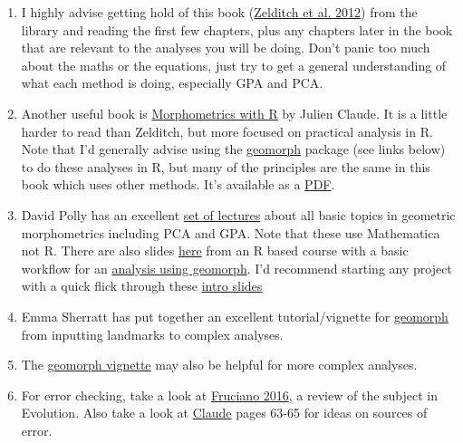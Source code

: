 \documentclass[]{book}
\begin{document}
\begin{enumerate}
\def\labelenumi{\arabic{enumi}.}
\item
  I highly advise getting hold of this book
  (\href{http://store.elsevier.com/Geometric-Morphometrics-for-Biologists/Miriam-Zelditch/isbn-9780123869036/}{Zelditch
  et al. 2012}) from the library and reading the first few chapters,
  plus any chapters later in the book that are relevant to the analyses
  you will be doing. Don't panic too much about the maths or the
  equations, just try to get a general understanding of what each method
  is doing, especially GPA and PCA.
\item
  Another useful book is
  \href{http://lib.du.ac.ir/documents/10157/60743/Morphometrics+With+R.pdf}{Morphometrics
  with R} by Julien Claude. It is a little harder to read than Zelditch,
  but more focused on practical analysis in R. Note that I'd generally
  advise using the
  \href{https://cran.r-project.org/web/packages/geomorph/geomorph.pdf}{geomorph}
  package (see links below) to do these analyses in R, but many of the
  principles are the same in this book which uses other methods. It's
  available as a
  \href{http://lib.du.ac.ir/documents/10157/60743/Morphometrics+With+R.pdf}{PDF}.
\item
  David Polly has an excellent \href{http://www.indiana.edu/~g562/}{set
  of lectures} about all basic topics in geometric morphometrics
  including PCA and GPA. Note that these use Mathematica not R. There
  are also slides \href{http://www.indiana.edu/~g562/PBDB2013/}{here}
  from an R based course with a basic workflow for an
  \href{http://www.indiana.edu/~g562/PBDB2013/Day\%202B\%20-\%20Geometric\%20Morphometrics\%20in\%20R.pdf}{analysis
  using geomorph}. I'd recommend starting any project with a quick flick
  through these
  \href{http://www.indiana.edu/~g562/PBDB2013/Day\%202A\%20-\%20Introduction\%20to\%20Geometric\%20Morphometrics.pdf}{intro
  slides}
\item
  Emma Sherratt has put together an excellent tutorial/vignette for
  \href{http://www.public.iastate.edu/~dcadams/PDFPubs/Quick\%20Guide\%20to\%20Geomorph\%20v2.0.pdf}{geomorph}
  from inputting landmarks to complex analyses.
\item
  The
  \href{https://cran.r-project.org/web/packages/geomorph/geomorph.pdf}{geomorph
  vignette} may also be helpful for more complex analyses.
\item
  For error checking, take a look at
  \href{http://link.springer.com/article/10.1007/s00427-016-0537-4}{Fruciano
  2016}, a review of the subject in Evolution. Also take a look at
  \href{http://lib.du.ac.ir/documents/10157/60743/Morphometrics+With+R.pdf}{Claude}
  pages 63-65 for ideas on sources of error.
\end{enumerate}
\end{document}
